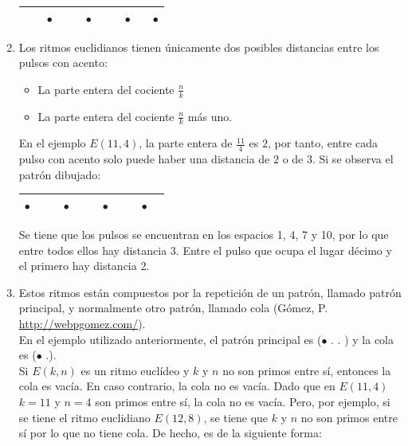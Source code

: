 \documentclass[a4paper, openright, 11pt, titlepage]{report}
\theoremstyle{definition}\newtheorem{defin}[propo]{Definition}
\theoremstyle{definition}\newtheorem{obser}[propo]{Remark}
\theoremstyle{definition}\newtheorem{ejem}[propo]{Ejemplo}
\theoremstyle{definition}\newtheorem{algoritmo}[propo]{Algoritmo}
\begin{document}
\begin{enumerate}
    \begin{table}[H]
        \centering
        \begin{tabular}{|c|c|c|c|c|c|c|c|c|c|c|}
        \hline
            & & $\bullet$ & & & $\bullet$ & & &$\bullet$ & &$\bullet$ \\
            \hline
        \end{tabular}
        \end{table}
    \item Los ritmos euclidianos tienen únicamente dos posibles distancias entre los pulsos con acento:
    \begin{itemize}
        \item La parte entera del cociente $\frac{n}{k}$
        \item La parte entera del cociente $\frac{n}{k}$ más uno.
    \end{itemize}
    En el ejemplo $E(11,4)$, la parte entera de $\frac{11}{4}$ es $2$, por tanto, entre cada pulso con acento solo puede haber una distancia de $2$ o de $3$. Si se observa el patrón dibujado:
    \begin{table}[H]
        \centering
        \begin{tabular}{|c|c|c|c|c|c|c|c|c|c|c|}
        \hline
            $\bullet$ & & & $\bullet$ & & & $\bullet$ & & &$\bullet$ &\\
            \hline
        \end{tabular}
    \end{table}
    Se tiene que los pulsos se encuentran en los espacios 1, 4, 7 y 10, por lo que entre todos ellos hay distancia 3. Entre el pulso que ocupa el lugar décimo y el primero hay distancia 2.
    \item Estos ritmos están compuestos por la repetición de un patrón, llamado patrón principal, y normalmente otro patrón, llamado cola \cite{ritmos} (Gómez, P. \url{http://webpgomez.com/}).\\
    En el ejemplo utilizado anteriormente, el patrón principal es ($\bullet$\hspace{0.1cm} .\hspace{0.1cm} . \hspace{0.1cm}) y la cola es ($\bullet$ \hspace{0.1cm}.\hspace{0.1cm}).\\
    Si $E(k, n)$ es un ritmo euclídeo y $k$ y $n$ no son primos entre sí, entonces la cola es vacía. En caso contrario, la cola no es vacía. Dado que en $E(11,4)$ $k = 11$ y $n = 4$ son primos entre sí, la cola no es vacía. Pero, por ejemplo, si se tiene el ritmo euclidiano $E(12,8)$, se tiene que $k$ y $n$ no son primos entre sí por lo que no tiene cola. De hecho, es de la siguiente forma:

\end{enumerate}
\end{document}
